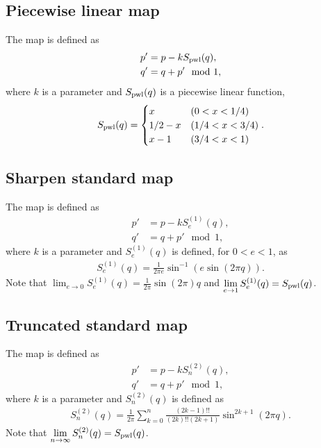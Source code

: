 \documentclass{article}
\begin{document}
\subsection*{Piecewise linear map}
The map is defined as
\begin{align*}
p'&=p-k S_{\rm pwl}(q),\\
q'&=q+p'\mod 1,
\end{align*}
where $k$ is a parameter and $S_{\rm pwl}(q)$ is a piecewise linear function,
\begin{align*}
S_{\rm pwl}(q)=
\begin{cases}
x&(0<x<1/4)\\
1/2-x&(1/4<x<3/4)\\
x-1&(3/4<x<1)
\end{cases}.
\end{align*}


\subsection*{Sharpen standard map}
The map is defined as
\begin{align*}
p'&=p-k S^{(1)}_{e}(q),\\
q'&=q+p'\mod 1,
\end{align*}
where $k$ is a parameter and $S^{(1)}_{e}(q)$ is defined, for $0<e<1$, as
\begin{align*}
S^{(1)}_{e}(q)=
\frac{1}{2\pi e}\sin^{-1}(e\sin(2\pi q)).
\end{align*}
Note that $\displaystyle \lim_{e\to 0}S^{(1)}_{e}(q)= \frac{1}{2\pi}\sin(2\pi) q$ and $\displaystyle \lim_{e\to 1}S^{(1)}_{e}(q)=S_{\rm pwl}(q)$.


\subsection*{Truncated standard map}
The map is defined as
\begin{align*}
p'&=p-k S^{(2)}_{n}(q),\\
q'&=q+p'\mod 1,
\end{align*}
where $k$ is a parameter and $S^{(2)}_{n}(q)$ is defined as
\begin{align*}
S^{(2)}_{n}(q)=
\frac{1}{2\pi}\sum_{k=0}^{n}\frac{(2k-1)!!}{(2k)!!(2k+1)}\sin^{2k+1}(2\pi q).
\end{align*}
Note that $\displaystyle \lim_{n\to \infty}S^{(2)}_{n}(q)=S_{\rm pwl}(q)$.
\end{document}
